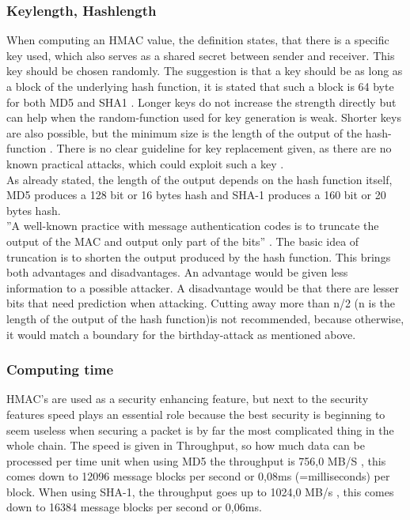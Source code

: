 \subsubsection{Keylength, Hashlength}
When computing an HMAC value, the definition states, that there is a specific key used, which also serves as a shared secret between sender and receiver. This key should be chosen randomly. The suggestion is that a key should be as long as a block of the underlying hash function, it is stated that such a block is 64 byte for both MD5 and SHA1 \cite{RFC}. Longer keys do not increase the strength directly but can help when the random-function used for key generation is weak. Shorter keys are also possible, but the minimum size is the length of the output of the hash-function \cite{RFC}. There is no clear guideline for key replacement given, as there are no known practical attacks, which could exploit such a key \cite{RFC}. \\
As already stated, the length of the output depends on the hash function itself, MD5 produces a 128 bit or 16 bytes hash and SHA-1 produces a 160 bit or 20 bytes hash. \\
''A well-known practice with message authentication codes is to truncate the output of the MAC and output only part of the bits'' \cite{RFC}. The basic idea of truncation is to shorten the output produced by the hash function. This brings both advantages and disadvantages. An advantage would be given less information to a possible attacker. A disadvantage would be that there are lesser bits that need prediction when attacking. Cutting away more than n/2 (n is the length of the output of the hash function)is not recommended, because otherwise, it would match a boundary for the birthday-attack as mentioned above. 
\subsubsection{Computing time}
HMAC’s are used as a security enhancing feature, but next to the security features speed plays an essential role because the best security is beginning to seem useless when securing a packet is by far the most complicated thing in the whole chain. The speed is given in Throughput, so how much data can be processed per time unit when using MD5 the throughput is 756,0 MB/S \cite{MAX}, this comes down to 12096 message blocks per second or 0,08ms (=milliseconds) per block. When using SHA-1, the throughput goes up to 1024,0 MB/s \cite{MAX}, this comes down to 16384 message blocks per second or 0,06ms.



